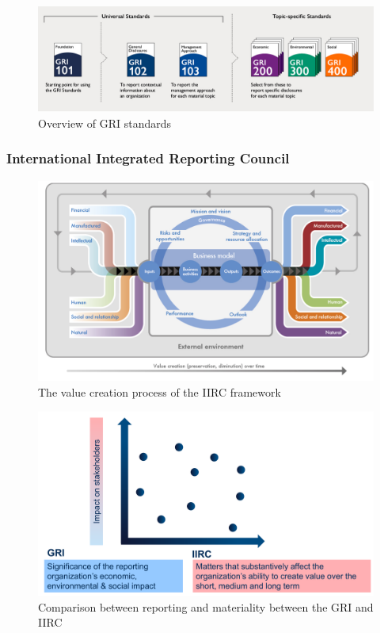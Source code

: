 \documentclass[11pt]{article}
\theoremstyle{definition}
\begin{document}
\begin{figure}[H]
	\centering
	\includegraphics[width=0.9\linewidth]{img/GRI_standards}
	\caption[Overview of GRI standards]{Overview of GRI standards\footnotemark}
	\label{fig:gristandards}
\end{figure}

\subsubsection{International Integrated Reporting Council}

\begin{figure}[H]
	\centering
	\includegraphics[width=0.8\linewidth]{img/IIRC_value_creation_process}
	\caption[The value creation process of the IIRC framework]{The value creation process of the IIRC framework\footnotemark}
	\label{fig:iircvaluecreationprocess}
\end{figure}

\begin{figure}[H]
	\centering
	\includegraphics[width=0.8\linewidth]{img/comparison_IIRC_GRI}
	\caption{Comparison between reporting and materiality between the GRI and IIRC}
	\label{fig:comparisoniircgri}
\end{figure}
\end{document}
